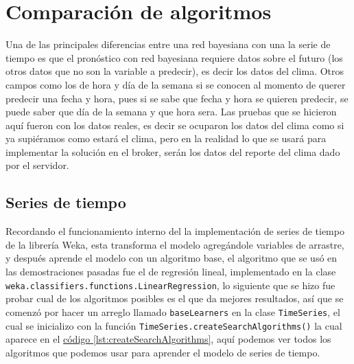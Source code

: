 \section{Comparación de algoritmos} \label{sec:comparacion}
Una de las principales diferencias entre una red bayesiana con una la serie de tiempo es que el pronóstico con red bayesiana requiere datos sobre el futuro (los otros datos que no son la variable a predecir), es decir los datos del clima. Otros campos como los de hora y día de la semana si se conocen al momento de querer predecir una fecha y hora, pues si se sabe que fecha y hora se quieren predecir, se puede saber que día de la semana y que hora sera.
Las pruebas que se hicieron aquí fueron con los datos reales, es decir se ocuparon los datos del clima como si ya supiéramos como estará el clima, pero en la realidad lo que se usará para implementar la solución en el broker, serán los datos del reporte del clima dado por el servidor.

\subsection{Series de tiempo} \label{subsec:compSeries}
Recordando el funcionamiento interno del la implementación de series de tiempo de la librería Weka, esta transforma el modelo agregándole variables de arrastre, y después aprende el modelo con un algoritmo base, el algoritmo que se usó en las demostraciones pasadas fue el de regresión lineal, implementado en la clase 
\texttt{weka.classifiers.functions.LinearRegression}, lo siguiente que se hizo fue probar cual de los algoritmos posibles es el que da mejores resultados, así que se comenzó por hacer un arreglo llamado \texttt{baseLearners} en la clase \texttt{TimeSeries}, el cual se inicializo con la función \texttt{TimeSeries.createSearchAlgorithms()} la cual aparece en el 
\hyperref[lst:createSearchAlgorithms]{ código \ref{lst:createSearchAlgorithms}}, aquí podemos ver todos los algoritmos que podemos usar para aprender el modelo de series de tiempo. %


